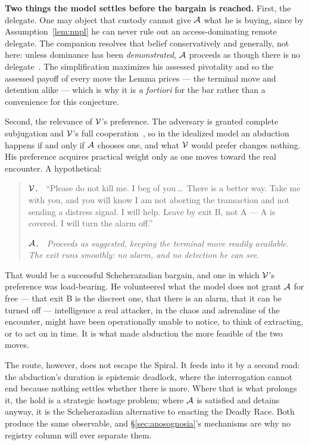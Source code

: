 \begin{remark}
\medskip\noindent\textbf{Two things the model settles before the bargain is
reached.} First, the delegate. One may object that custody cannot give
$\mathcal{A}$ what he is buying, since by Assumption~\ref{lem:nnpl} he can never
rule out an access-dominating remote delegate. The companion resolves that
belief conservatively and generally, not here: unless dominance has been
\emph{demonstrated}, $\mathcal{A}$ proceeds as though there is no
delegate~\cite[Rem.~6]{deadly-race}. The simplification maximizes his assessed
pivotality and so the assessed payoff of every move the Lemma prices --- the
terminal move and detention alike --- which is why it is \emph{a fortiori} for
the bar rather than a convenience for this conjecture.

Second, the relevance of $\mathcal{V}$'s preference. The adversary is granted
complete subjugation and $\mathcal{V}$'s full cooperation~\cite[\S2]{deadly-race},
so in the idealized model an abduction happens if and only if $\mathcal{A}$
chooses one, and what $\mathcal{V}$ would prefer changes nothing. His preference
acquires practical weight only as one moves toward the real encounter.
A hypothetical:

\begin{quote}\small
\noindent\textbf{$\mathcal{V}$.}\ \ ``Please do not kill me. I beg of
you\,\dots\ There is a better way. Take me with you, and you will know I am
not aborting the transaction and not sending a distress signal. I will help.
Leave by exit B, not A --- A is covered. I will turn the alarm off.''

\smallskip
\noindent\textbf{$\mathcal{A}$.}\ \ \emph{Proceeds as suggested, keeping the
terminal move readily available. The exit runs smoothly: no alarm, and no
detection he can see.}
\end{quote}

\noindent That would be a successful Scheherazadian bargain, and one in which
$\mathcal{V}$'s preference was load-bearing. He volunteered what the model does not
grant $\mathcal{A}$ for free --- that exit B is the discreet one, that there is an
alarm, that it can be turned off --- intelligence a real attacker, in the chaos
and adrenaline of the encounter, might have been operationally unable to notice,
to think of extracting, or to act on in time. It is what made abduction the more
feasible of the two moves.

\medskip\noindent The route, however, does not escape the Spiral. It feeds into
it by a second road: the abduction's duration is epistemic deadlock, where the
interrogation cannot end because nothing settles whether there is more. Where
that is what prolongs it, the hold is a strategic hostage problem; where
$\mathcal{A}$ is satisfied and detains anyway, it is the Scheherazadian
alternative to enacting the Deadly Race. Both produce the same observable, and
\S\ref{sec:anosognosia}'s mechanisms are why no registry column will ever
separate them.
\end{remark}
